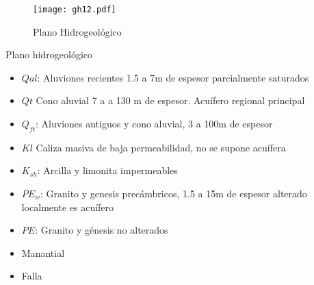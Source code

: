 \begin{figure}[h!]
\centering
  \texttt{[image: gh12.pdf]}
  \caption{Plano Hidrogeológico}
  \label{gh12}
\end{figure}
Plano hidrogeológico
\begin{itemize}
    \item $Qal$: Aluviones recientes 1.5 a 7m de espesor parcialmente saturados
    \item $Qt$ Cono aluvial 7 a a 130 m de espesor. Acuífero regional principal
    \item $Q_{ft}$: Aluviones antiguos y cono aluvial, 3 a 100m de espesor
    \item $Kl$ Caliza masiva de baja permeabilidad, no se supone acuífera
    \item $K_{sh}$: Arcilla y limonita impermeables
    \item $PE_{w}$: Granito y genesis precámbricos, 1.5 a 15m de espesor alterado localmente es acuífero
    \item $PE$: Granito y génesis no alterados
    \item Manantial
    \item Falla
\end{itemize}


